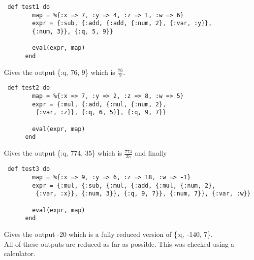 \documentclass[a4paper,11pt]{article}
\begin{document}
\begin{verbatim}
 def test1 do
        map = %{:x => 7, :y => 4, :z => 1, :w => 6}
        expr = {:sub, {:add, {:add, {:num, 2}, {:var, :y}}, 
        {:num, 3}}, {:q, 5, 9}}

        eval(expr, map)
      end
\end{verbatim}
Gives the output \{:q, 76, 9\} which is $\frac{76}{9}$.

\begin{verbatim}
 def test2 do
        map = %{:x => 7, :y => 2, :z => 8, :w => 5}
        expr = {:mul, {:add, {:mul, {:num, 2},
         {:var, :z}}, {:q, 6, 5}}, {:q, 9, 7}}

        eval(expr, map)
      end
      \end{verbatim}
 Gives the output \{:q, 774, 35\} which is $\frac{774}{35}$ and finally
 \begin{verbatim}
 def test3 do
        map = %{:x => 9, :y => 6, :z => 18, :w => -1}
        expr = {:mul, {:sub, {:mul, {:add, {:mul, {:num, 2},
         {:var, :x}}, {:num, 3}}, {:q, 9, 7}}, {:num, 7}}, {:var, :w}}

        eval(expr, map)
      end
      \end{verbatim}
 Gives the output -20 which is a fully reduced version of \{:q, -140, 7\}.\\
      
 
 All of these outputs are reduced as far as possible. This was checked using a calculator.
 
\end{document}
